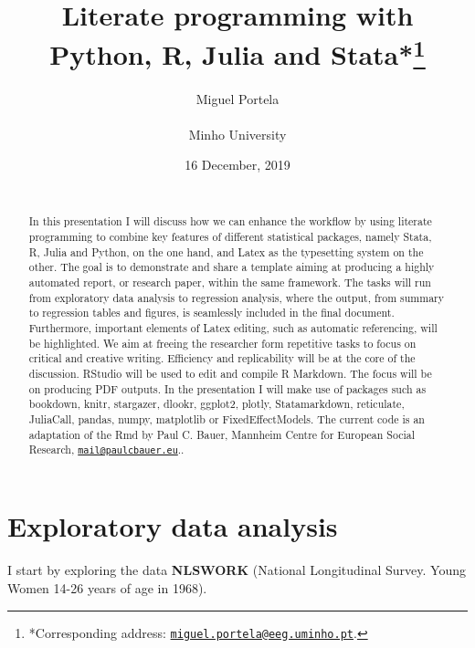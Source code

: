 \documentclass[
  12pt,
]{article}
\title{\vspace{1cm}Literate programming with Python, R, Julia and Stata*\footnote{*Corresponding address: \href{mailto:miguel.portela@eeg.uminho.pt}{\nolinkurl{miguel.portela@eeg.uminho.pt}}.}\vspace{0.5cm}\\}
\author{Miguel Portela\\
~\\
Minho University\\}
\date{16 December, 2019\\
~\\}
\begin{document}
\maketitle
\begin{abstract}
\noindent{}In this presentation I will discuss how we can enhance the workflow by using literate programming to combine key features of different statistical packages, namely Stata, R, Julia and Python, on the one hand, and Latex as the typesetting system on the other. The goal is to demonstrate and share a template aiming at producing a highly automated report, or research paper, within the same framework. The tasks will run from exploratory data analysis to regression analysis, where the output, from summary to regression tables and figures, is seamlessly included in the final document. Furthermore, important elements of Latex editing, such as automatic referencing, will be highlighted. We aim at freeing the researcher form repetitive tasks to focus on critical and creative writing. Efficiency and replicability will be at the core of the discussion. RStudio will be used to edit and compile R Markdown. The focus will be on producing PDF outputs. In the presentation I will make use of packages such as bookdown, knitr, stargazer, dlookr, ggplot2, plotly, Statamarkdown, reticulate, JuliaCall, pandas, numpy, matplotlib or FixedEffectModels. The current code is an adaptation of the Rmd by Paul C. Bauer, Mannheim Centre for European Social Research, \href{mailto:mail@paulcbauer.eu}{\nolinkurl{mail@paulcbauer.eu}}..\vspace{.8cm}
\end{abstract}

\clearpage

\renewcommand{\baselinestretch}{0.5}\normalsize

\renewcommand{\baselinestretch}{1.1}\normalsize

\clearpage

\hypertarget{exploratory-data-analysis}{%
\section{Exploratory data analysis}\label{exploratory-data-analysis}}

I start by exploring the data \textbf{NLSWORK} (National Longitudinal Survey. Young Women 14-26 years of age in 1968).
\end{document}
